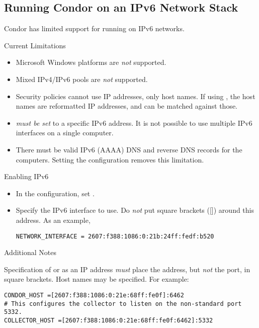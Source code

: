 \subsection{\label{sec:ipv6}Running Condor on an IPv6 Network Stack}

Condor has limited support for running on IPv6 networks.

Current Limitations

\begin{itemize}
    \item{Microsoft Windows platforms are \emph{not} supported.}
    \item{Mixed IPv4/IPv6 pools are \emph{not} supported.}
    \item{Security policies cannot use IP addresses, only host names.
If using , the host names are reformatted IP addresses,
and can be matched against those. }
    \item{ \emph{must be set} to a 
specific IPv6 address. 
It is not possible to use multiple IPv6 interfaces on a single computer.}
    \item{There must be valid IPv6 (AAAA) DNS and reverse DNS records for 
the computers. 
Setting the configuration  removes this limitation.}
\end{itemize}

Enabling IPv6

\begin{itemize}
    \item{In the configuration, set .}
    \item{Specify the IPv6 interface to use. 
Do \emph{not} put square brackets ([]) around this address.
As an example,
\begin{verbatim}
NETWORK_INTERFACE = 2607:f388:1086:0:21b:24ff:fedf:b520
\end{verbatim}
}
\end{itemize}

Additional Notes

Specification of   or 
as an IP address \emph{must} place the address, 
but \emph{not} the port, in square brackets. 
Host names may be specified. 
For example:

\begin{verbatim}
CONDOR_HOST =[2607:f388:1086:0:21e:68ff:fe0f]:6462
# This configures the collector to listen on the non-standard port 5332.
COLLECTOR_HOST =[2607:f388:1086:0:21e:68ff:fe0f:6462]:5332
\end{verbatim}


